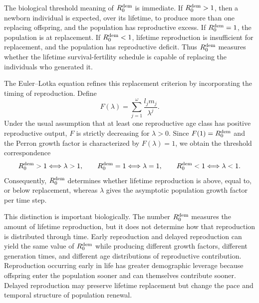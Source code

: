 \documentclass[10pt,a4paper]{amsart}
\theoremstyle{definition}
\theoremstyle{remark}
\numberwithin{equation}{section}
\begin{document}
The biological threshold meaning of $R_0^{\rm dem}$ is immediate. If $R_0^{\rm dem}>1$, then a newborn individual is expected, over its lifetime, to produce more than one replacing offspring, and the population has reproductive excess. If $R_0^{\rm dem}=1$, the population is at replacement. If $R_0^{\rm dem}<1$, lifetime reproduction is insufficient for replacement, and the population has reproductive deficit. Thus $R_0^{\rm dem}$ measures whether the lifetime survival-fertility schedule is capable of replacing the individuals who generated it.

The Euler--Lotka equation refines this replacement criterion by incorporating the timing of reproduction. Define
\[
F(\lambda)=\sum_{j=1}^{\omega}\frac{l_jm_j}{\lambda^j}.
\]
Under the usual assumption that at least one reproductive age class has positive reproductive output, $F$ is strictly decreasing for $\lambda>0$. Since $F(1)=R_0^{\rm dem}$ and the Perron growth factor is characterized by $F(\lambda)=1$, we obtain the threshold correspondence
\begin{equation}
\label{eq:R0_lambda_threshold}
R_0^{\rm dem}>1 \Longleftrightarrow \lambda>1,
\qquad
R_0^{\rm dem}=1 \Longleftrightarrow \lambda=1,
\qquad
R_0^{\rm dem}<1 \Longleftrightarrow \lambda<1.
\end{equation}
Consequently, $R_0^{\rm dem}$ determines whether lifetime reproduction is above, equal to, or below replacement, whereas $\lambda$ gives the asymptotic population growth factor per time step.

This distinction is important biologically. The number $R_0^{\rm dem}$ measures the amount of lifetime reproduction, but it does not determine how that reproduction is distributed through time. Early reproduction and delayed reproduction can yield the same value of $R_0^{\rm dem}$ while producing different growth factors, different generation times, and different age distributions of reproductive contribution. Reproduction occurring early in life has greater demographic leverage because offspring enter the population sooner and can themselves contribute sooner. Delayed reproduction may preserve lifetime replacement but change the pace and temporal structure of population renewal.
\end{document}
